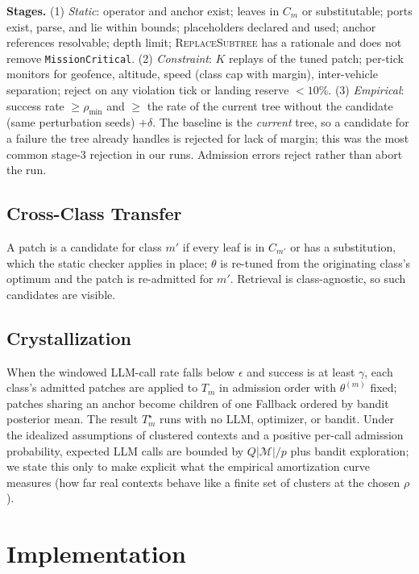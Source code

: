 \documentclass[conference]{IEEEtran}
\begin{document}
\textbf{Stages.} (1) \emph{Static}: operator and anchor exist; leaves in $C_m$ or substitutable; ports exist, parse, and lie within bounds; placeholders declared and used; anchor references resolvable; depth limit; \textsc{ReplaceSubtree} has a rationale and does not remove \texttt{MissionCritical}. (2) \emph{Constraint}: $K$ replays of the tuned patch; per-tick monitors for geofence, altitude, speed (class cap with margin), inter-vehicle separation; reject on any violation tick or landing reserve $<10\%$. (3) \emph{Empirical}: success rate $\ge\rho_{\min}$ and $\ge$ the rate of the current tree without the candidate (same perturbation seeds) $+\delta$. The baseline is the \emph{current} tree, so a candidate for a failure the tree already handles is rejected for lack of margin; this was the most common stage-3 rejection in our runs. Admission errors reject rather than abort the run.

\subsection{Cross-Class Transfer}
A patch is a candidate for class $m'$ if every leaf is in $C_{m'}$ or has a substitution, which the static checker applies in place; $\theta$ is re-tuned from the originating class's optimum and the patch is re-admitted for $m'$. Retrieval is class-agnostic, so such candidates are visible.

\subsection{Crystallization}
\label{sec:crystal}
When the windowed LLM-call rate falls below $\epsilon$ and success is at least $\gamma$, each class's admitted patches are applied to $T_m$ in admission order with $\theta^{(m)}$ fixed; patches sharing an anchor become children of one Fallback ordered by bandit posterior mean. The result $T^\star_m$ runs with no LLM, optimizer, or bandit. Under the idealized assumptions of clustered contexts and a positive per-call admission probability, expected LLM calls are bounded by $Q|\mathcal{M}|/p$ plus bandit exploration; we state this only to make explicit what the empirical amortization curve measures (how far real contexts behave like a finite set of clusters at the chosen $\rho$).

\section{Implementation}
\label{sec:impl}
\end{document}

